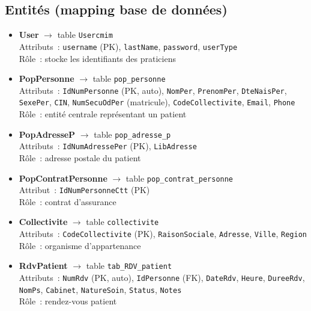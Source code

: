 \subsection{Entités (mapping base de données)}

\begin{itemize}
    \item \textbf{User} $\rightarrow$ table \texttt{Usercmim}\\
    Attributs~: \texttt{username} (PK), \texttt{lastName}, \texttt{password}, \texttt{userType}\\
    Rôle~: stocke les identifiants des praticiens

    \item \textbf{PopPersonne} $\rightarrow$ table \texttt{pop\_personne}\\
    Attributs~: \texttt{IdNumPersonne} (PK, auto), \texttt{NomPer}, \texttt{PrenomPer}, \texttt{DteNaisPer}, \texttt{SexePer}, \texttt{CIN}, \texttt{NumSecuOdPer} (matricule), \texttt{CodeCollectivite}, \texttt{Email}, \texttt{Phone}\\
    Rôle~: entité centrale représentant un patient

    \item \textbf{PopAdresseP} $\rightarrow$ table \texttt{pop\_adresse\_p}\\
    Attributs~: \texttt{IdNumAdressePer} (PK), \texttt{LibAdresse}\\
    Rôle~: adresse postale du patient

    \item \textbf{PopContratPersonne} $\rightarrow$ table \texttt{pop\_contrat\_personne}\\
    Attribut~: \texttt{IdNumPersonneCtt} (PK)\\
    Rôle~: contrat d'assurance

    \item \textbf{Collectivite} $\rightarrow$ table \texttt{collectivite}\\
    Attributs~: \texttt{CodeCollectivite} (PK), \texttt{RaisonSociale}, \texttt{Adresse}, \texttt{Ville}, \texttt{Region}\\
    Rôle~: organisme d'appartenance

    \item \textbf{RdvPatient} $\rightarrow$ table \texttt{tab\_RDV\_patient}\\
    Attributs~: \texttt{NumRdv} (PK, auto), \texttt{IdPersonne} (FK), \texttt{DateRdv}, \texttt{Heure}, \texttt{DureeRdv}, \texttt{NomPs}, \texttt{Cabinet}, \texttt{NatureSoin}, \texttt{Status}, \texttt{Notes}\\
    Rôle~: rendez-vous patient


\end{itemize}

